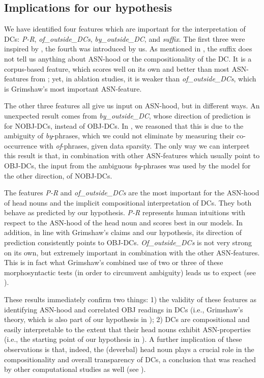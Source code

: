 \documentclass[output=paper]{langsci/langscibook}
\begin{document}
\subsection{Implications for our hypothesis}\label{sec:discussion-hypothesis}


We have identified four features which are important for the interpretation of DCs: \textit{P-R}, \textit{of\_outside\_DCs}, \textit{by\_outside\_DC}, and \textit{suffix}. The first three were inspired by \cite{grimshaw:90}, the fourth was introduced by us. As mentioned in , the suffix does not tell us anything about ASN-hood or the compositionality of the DC. It is a corpus-based feature, which scores well on its own and better than most ASN-features from \cite{grimshaw:90}; yet, in ablation studies, it is weaker than \textit{of\_outside\_DCs}, which is Grimshaw's most important ASN-feature.

The other three features all give us input on ASN-hood, but in different ways. An unexpected result comes from \textit{by\_outside\_DC}, whose direction of prediction is for NOBJ-DCs, instead of OBJ-DCs. In , we reasoned that this is due to the ambiguity of \textit{by}-phrases, which we could not eliminate by measuring their co-occurrence with \textit{of}-phrases, given data sparsity. The only way we can interpret this result is that, in combination with other ASN-features which usually point to OBJ-DCs, the input from the ambiguous \textit{by}-phrases was used by the model for the other direction, of NOBJ-DCs.

The features \textit{P-R} and \textit{of\_outside\_DCs} are the most important for the ASN-hood of head nouns and the implicit compositional interpretation of DCs. They both behave as predicted by our hypothesis. \textit{P-R} represents human intuitions with respect to the ASN-hood of the head noun and scores best in our models. In addition, in line with Grimshaw's claims and our hypothesis, its direction of prediction consistently points to OBJ-DCs. \textit{Of\_outside\_DCs} is not very strong on its own, but extremely important in combination with the other ASN-features. This is in fact what Grimshaw's combined use of two or three of these morphosyntactic tests (in order to circumvent ambiguity) leads us to expect (see ).

These results immediately confirm two things: 1) the validity of these features as identifying ASN-hood and correlated OBJ readings in DCs (i.e., Grimshaw's theory, which is also part of our hypothesis in ); 2) DCs are compositional and easily interpretable to the extent that their head nouns exhibit ASN-properties (i.e., the starting point of our hypothesis in ). A further implication of these observations is that, indeed, the (deverbal) head noun  plays a crucial role in the compositionality  {and overall} transparency of DCs, a conclusion that was reached by other computational studies as well (see ). 
\end{document}
